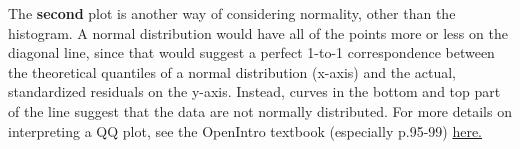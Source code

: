\documentclass[]{article}
\begin{document}
The \textbf{second} plot is another way of considering normality, other
than the histogram. A normal distribution would have all of the points
more or less on the diagonal line, since that would suggest a perfect
1-to-1 correspondence between the theoretical quantiles of a normal
distribution (x-axis) and the actual, standardized residuals on the
y-axis. Instead, curves in the bottom and top part of the line suggest
that the data are not normally distributed. For more details on
interpreting a QQ plot, see the OpenIntro textbook (especially p.95-99)
\href{https://drive.google.com/file/d/0B-DHaDEbiOGkRHNndUlBaHVmaGM/edit}{here.}
\end{document}
